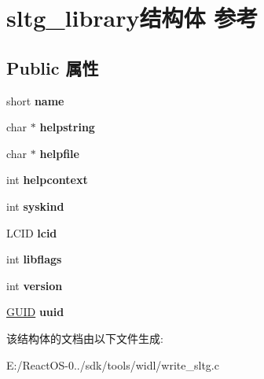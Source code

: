 \hypertarget{structsltg__library}{}\section{sltg\+\_\+library结构体 参考}
\label{structsltg__library}
\subsection*{Public 属性}
\begin{DoxyCompactItemize}
\item 
\mbox{\label{structsltg__library_acf94b26c600d5b2121d25d47dbc1a252}} 
short {\bfseries name}
\item 
\mbox{\label{structsltg__library_af0acc2c902bd03ee118fb6468249d45c}} 
char $\ast$ {\bfseries helpstring}
\item 
\mbox{\label{structsltg__library_aa99abcfa0db9a0e362c6d37ecab7f9cd}} 
char $\ast$ {\bfseries helpfile}
\item 
\mbox{\label{structsltg__library_a1fa3219a7204d7e78f5cc6b7ef457ac9}} 
int {\bfseries helpcontext}
\item 
\mbox{\label{structsltg__library_a4690f3a9560e03e4bd90cce243e3dbfe}} 
int {\bfseries syskind}
\item 
\mbox{\label{structsltg__library_a036de28fc35e98d45a1a2da28975e260}} 
L\+C\+ID {\bfseries lcid}
\item 
\mbox{\label{structsltg__library_a782a9eb93d1513cff0a4d595318e7f99}} 
int {\bfseries libflags}
\item 
\mbox{\label{structsltg__library_a351503f588693884d6bd35e4cf304e5a}} 
int {\bfseries version}
\item 
\mbox{\label{structsltg__library_acddcd947ec67421423252d6e62bbf949}} 
\hyperlink{interface_g_u_i_d}{G\+U\+ID} {\bfseries uuid}
\end{DoxyCompactItemize}


该结构体的文档由以下文件生成\+:\begin{DoxyCompactItemize}
\item 
E\+:/\+React\+O\+S-\/0../sdk/tools/widl/write\+\_\+sltg.\+c\end{DoxyCompactItemize}
